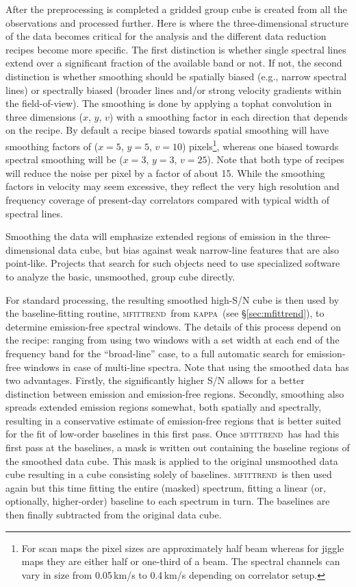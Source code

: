 \documentclass[a4paper,fleqn,usenatbib]{mnras}
\newcommand{\KAPPA}{\textsc{kappa}}
\newcommand{\mfittrend}{\textsc{mfittrend}}
\begin{document}
After the preprocessing is completed a gridded group cube is created
from all the observations and processed further. Here is where the
three-dimensional structure of the data becomes critical for the analysis
and the different data reduction recipes become more specific. The first
distinction is whether single spectral lines extend over a significant
fraction of the available band or not. If not, the second distinction
is whether smoothing should be spatially biased (e.g., narrow spectral
lines) or spectrally biased (broader lines and/or strong velocity
gradients within the field-of-view). The smoothing is done by applying
a tophat convolution in three dimensions ($x$, $y$, $v$) with a smoothing
factor in each direction that depends on the recipe.  By default a
recipe biased towards spatial smoothing will have smoothing factors of
($x=5$, $y=5$, $v=10$) pixels\footnote{For scan maps the pixel sizes
  are approximately half beam whereas for jiggle maps they are either
  half or one-third of a beam. The spectral channels can vary in size
  from 0.05\,km/s to 0.4\,km/s depending on correlator setup.},
 whereas one biased towards spectral smoothing
will be ($x=3$, $y=3$, $v=25$). Note that both type of recipes will reduce
the noise per pixel by a factor of about 15. While the smoothing
factors in velocity may seem excessive, they reflect the very high
resolution and frequency coverage of present-day correlators
compared with typical width of spectral lines.

Smoothing the data will emphasize extended regions of emission in the
three-dimensional data cube, but bias against weak narrow-line features that are also
point-like. Projects that search for such objects need to use specialized
software to analyze the basic, unsmoothed, group cube directly.

For standard processing, the resulting smoothed high-S/N cube
is then used by the baseline-fitting routine, \mfittrend\ from
\KAPPA\  (see \S\ref{sec:mfittrend}),
to determine emission-free spectral windows.
The details of this process depend on the recipe: ranging from using two
windows with a set width at each end of the frequency band
for the ``broad-line'' case, to a full automatic search for emission-free
windows in case of multi-line spectra. Note that using the smoothed data has
two advantages. Firstly, the significantly higher S/N allows for a better
distinction between emission and emission-free regions. Secondly, smoothing
also spreads extended emission regions somewhat, both spatially and spectrally,
resulting in a conservative estimate of emission-free regions that is better suited for
the fit of low-order baselines in this first pass. Once \mfittrend\ has
had this first pass at the baselines, a mask is written out containing the
baseline regions of the smoothed data cube. This mask is applied to the original
unsmoothed data cube resulting in a cube consisting solely of
baselines. \mfittrend\ is then used again but this time fitting
the entire (masked) spectrum, fitting a linear (or, optionally, higher-order) baseline
to each spectrum in turn. The baselines are then finally subtracted from the
original data cube.
\end{document}
